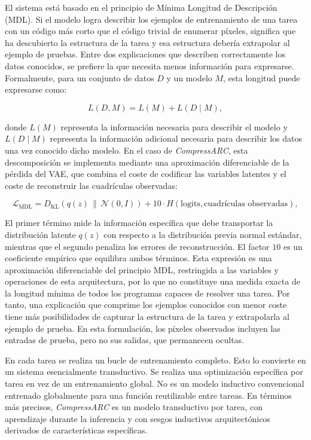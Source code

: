 \documentclass[11pt,a4paper,spanish]{book}
\numberwithin{equation}{chapter}
\numberwithin{figure}{chapter}
\begin{document}
El sistema está basado en el principio de Mínima Longitud de Descripción (MDL). Si el modelo logra describir los ejemplos de entrenamiento de una
tarea con un código más corto que el código trivial de enumerar píxeles, significa que ha descubierto la estructura
de la tarea y esa estructura debería extrapolar al ejemplo de pruebas. Entre dos explicaciones que describen correctamente los datos conocidos, 
se prefiere la que necesita menos información para expresarse. Formalmente, para un conjunto
de datos $D$ y un modelo $M$, esta longitud puede expresarse como:

\begin{equation}
	L(D,M) = L(M) + L(D\mid M),
	\label{eq:mdl-general}
\end{equation}

donde $L(M)$ representa la información necesaria para describir el modelo y
$L(D\mid M)$ representa la información adicional necesaria para describir los datos una vez conocido dicho modelo. En el caso de
\textit{CompressARC}, esta descomposición se implementa mediante una aproximación diferenciable de la pérdida del VAE, que combina el coste de
codificar las variables latentes y el coste de reconstruir las cuadrículas observadas:

\begin{equation}
	\mathcal{L}_{\mathrm{MDL}} =
	D_{\mathrm{KL}}\left(q(z)\,\middle\|\,\mathcal{N}(0,I)\right)
	+ 10 \cdot H\left(\mathrm{logits},\text{cuadrículas observadas}\right),
	\label{eq:mdl-compressarc}
\end{equation}

El primer término mide la información específica que debe transportar la distribución latente $q(z)$ con respecto a la distribución previa normal
estándar, mientras que el segundo penaliza los errores de reconstrucción. El factor $10$ es un coeficiente empírico que equilibra ambos términos.
Esta expresión es una aproximación diferenciable del principio MDL, restringida a las variables y operaciones de esta arquitectura, por lo que no
constituye una medida exacta de la longitud mínima de todos los programas capaces de resolver una tarea. Por tanto, una explicación que comprime
los ejemplos conocidos con menor coste tiene más posibilidades de capturar la estructura de la tarea y extrapolarla al ejemplo de prueba. En esta
formulación, los píxeles observados incluyen las entradas de prueba, pero no sus salidas, que permanecen ocultas.

En cada tarea se realiza un bucle de entrenamiento completo. Esto lo convierte en un sistema esencialmente transductivo. Se realiza
una optimización específica por tarea en vez de un entrenamiento global. No es un modelo inductivo convencional entrenado globalmente para
una función reutilizable entre tareas. En términos más precisos, \textit{CompressARC} es un modelo transductivo por tarea,
con aprendizaje durante la inferencia y con sesgos inductivos arquitectónicos derivados de características específicas.
\end{document}

